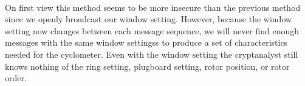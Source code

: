 

\text{}\\On first view this method seems to be more insecure than the
previous method since we openly broadcast our window setting.
However, because the window setting now changes between each message
sequence, we will never find enough messages with the same window
settingss to produce a set of characteristics needed for the
cyclometer. Even with the window setting the cryptanalyst still knows
nothing of the ring setting, plugboard setting, rotor position, or rotor order.

